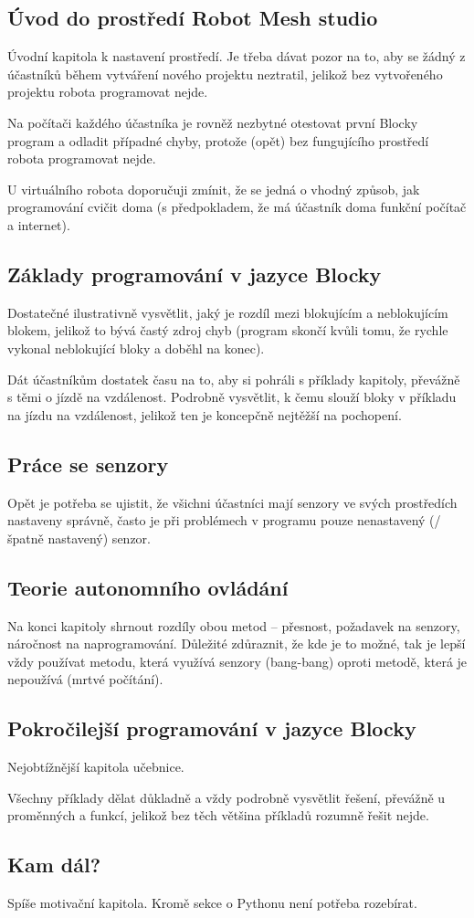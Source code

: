 \subsection{Úvod do prostředí Robot Mesh studio}
Úvodní kapitola k nastavení prostředí. Je třeba dávat pozor na to, aby se žádný z účastníků během vytváření nového projektu neztratil, jelikož bez vytvořeného projektu robota programovat nejde.

Na počítači každého účastníka je rovněž nezbytné otestovat první Blocky program a odladit případné chyby, protože (opět) bez fungujícího prostředí robota programovat nejde.

U virtuálního robota doporučuji zmínit, že se jedná o vhodný způsob, jak programování cvičit doma (s předpokladem, že má účastník doma funkční počítač a internet).

\subsection{Základy programování v jazyce Blocky}
Dostatečné ilustrativně vysvětlit, jaký je rozdíl mezi blokujícím a neblokujícím blokem, jelikož to bývá častý zdroj chyb (program skončí kvůli tomu, že rychle vykonal neblokující bloky a doběhl na konec).

Dát účastníkům dostatek času na to, aby si pohráli s příklady kapitoly, převážně s těmi o jízdě na vzdálenost. Podrobně vysvětlit, k čemu slouží bloky v příkladu na jízdu na vzdálenost, jelikož ten je koncepčně nejtěžší na pochopení.

\subsection{Práce se senzory}
Opět je potřeba se ujistit, že všichni účastníci mají senzory ve svých prostředích nastaveny správně, často je při problémech v programu pouze nenastavený (/špatně nastavený) senzor.

\subsection{Teorie autonomního ovládání}
Na konci kapitoly shrnout rozdíly obou metod -- přesnost, požadavek na senzory, náročnost na naprogramování. Důležité zdůraznit, že kde je to možné, tak je lepší vždy používat metodu, která využívá senzory (bang-bang) oproti metodě, která je nepoužívá (mrtvé počítání).

\subsection{Pokročilejší programování v jazyce Blocky}
Nejobtížnější kapitola učebnice.

Všechny příklady dělat důkladně a vždy podrobně vysvětlit řešení, převážně u proměnných a funkcí, jelikož bez těch většina příkladů rozumně řešit nejde.

\subsection{Kam dál?}
Spíše motivační kapitola. Kromě sekce o Pythonu není potřeba rozebírat.


